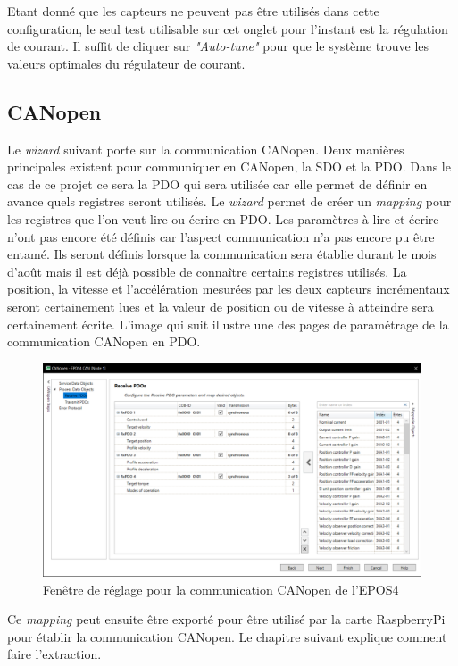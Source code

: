 Etant donné que les capteurs ne peuvent pas être utilisés dans cette configuration, le seul test utilisable sur cet onglet pour l'instant
est la régulation de courant. Il suffit de cliquer sur \textit{"Auto-tune"} pour que le système trouve les valeurs optimales du régulateur de
courant.\\

\subsection{CANopen}
Le \textit{\gls{wizard}} suivant porte sur la communication CANopen. Deux manières principales existent pour communiquer en CANopen, la SDO et la PDO.
Dans le cas de ce projet ce sera la PDO qui sera utilisée car elle permet de définir en avance quels registres seront utilisés. Le \textit{\gls{wizard}}
permet de créer un \textit{mapping} pour les registres que l'on veut lire ou écrire en PDO. Les paramètres à lire et écrire n'ont pas encore été définis car l'aspect communication n'a pas encore pu être entamé.
Ils seront définis lorsque la communication sera établie durant le mois d'août mais il est déjà possible de connaître certains registres utilisés.
La position, la vitesse et l'accélération mesurées par les deux capteurs incrémentaux seront certainement lues et la valeur de position ou de vitesse
à atteindre sera certainement écrite. L'image qui suit illustre une des pages de paramétrage de la communication CANopen en PDO.

\begin{figure}[H]
    \centering
    \includegraphics[width = \textwidth]{assets/figures/ParamCANopen.png}
    \caption{Fenêtre de réglage pour la communication CANopen de l'EPOS4}
    \label{fig:ParamCAN}
\end{figure}

Ce \textit{mapping} peut ensuite être exporté pour être utilisé par la carte RaspberryPi pour établir la communication CANopen. Le chapitre suivant
explique comment faire l'extraction.


